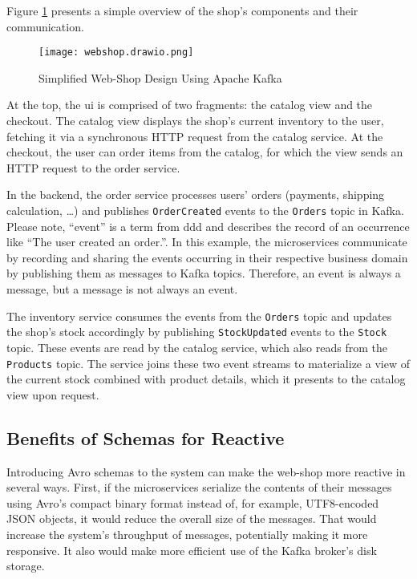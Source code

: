 Figure \ref{fig:web-shop} presents a simple overview of the shop's components and their communication.

\begin{figure}[H]
  \centering
  \texttt{[image: webshop.drawio.png]}
  \caption{Simplified Web-Shop Design Using Apache Kafka}\label{fig:web-shop}
\end{figure}

At the top, the \gls{ui} is comprised of two fragments: the catalog view and the checkout.
The catalog view displays the shop's current inventory to the user, fetching it via a synchronous HTTP request from the catalog service.
At the checkout, the user can order items from the catalog, for which the view sends an HTTP request to the order service.

In the backend, the order service processes users' orders (payments, shipping calculation, \ldots) and publishes \texttt{OrderCreated} events to the \texttt{Orders} topic in Kafka.
Please note, \enquote{event} is a term from \gls{ddd} and describes the record of an occurrence like \enquote{The user created an order.}.
In this example, the microservices communicate by recording and sharing the events occurring in their respective business domain by publishing them as messages to Kafka topics.
Therefore, an event is always a message, but a message is not always an event.

The inventory service consumes the events from the \texttt{Orders} topic and updates the shop's stock accordingly by publishing \texttt{StockUpdated} events to the \texttt{Stock} topic.
These events are read by the catalog service, which also reads from the \texttt{Products} topic.
The service joins these two event streams to materialize a view of the current stock combined with product details, which it presents to the catalog view upon request.

\subsection{Benefits of Schemas for Reactive }\label{sec:schema-benefits}

Introducing Avro schemas to the system can make the web-shop more reactive in several ways.
First, if the microservices serialize the contents of their messages using Avro's compact binary format instead of, for example, UTF8-encoded JSON objects, it would reduce the overall size of the messages.
That would increase the system's throughput of messages, potentially making it more responsive.
It also would make more efficient use of the Kafka broker's disk storage.

